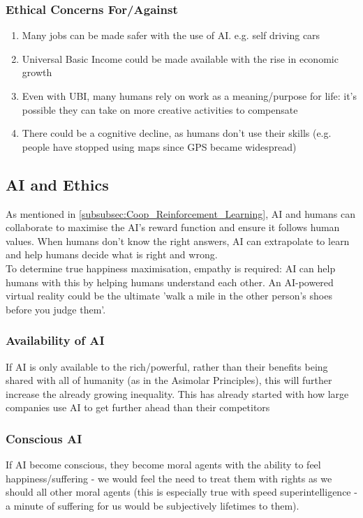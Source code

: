 \subsubsection{Ethical Concerns For/Against}
\begin{enumerate}
    \item Many jobs can be made safer with the use of AI. e.g. self driving cars
    \item Universal Basic Income could be made available with the rise in economic growth
    \item Even with UBI, many humans rely on work as a meaning/purpose for life: it's possible they can take on more creative activities to compensate
    \item There could be a cognitive decline, as humans don't use their skills (e.g. people have stopped using maps since GPS became widespread)
\end{enumerate}

\subsection{AI and Ethics}
As mentioned in \ref{subsubsec:Coop_Reinforcement_Learning}, AI and humans can collaborate to maximise the AI's reward function and ensure it follows human values. When humans don't know the right answers, AI can extrapolate to learn and help humans decide what is right and wrong. \\
To determine true happiness maximisation, empathy is required: AI can help humans with this by helping humans understand each other. An AI-powered virtual reality could be the ultimate 'walk a mile in the other person's shoes before you judge them'.

\subsubsection{Availability of AI}
If AI is only available to the rich/powerful, rather than their benefits being shared with all of humanity (as in the Asimolar Principles), this will further increase the already growing inequality. This has already started with how large companies use AI to get further ahead than their competitors

\subsubsection{Conscious AI}
If AI become conscious, they become moral agents with the ability to feel happiness/suffering - we would feel the need to treat them with rights as we should all other moral agents (this is especially true with speed superintelligence - a minute of suffering for us would be subjectively lifetimes to them). \\

